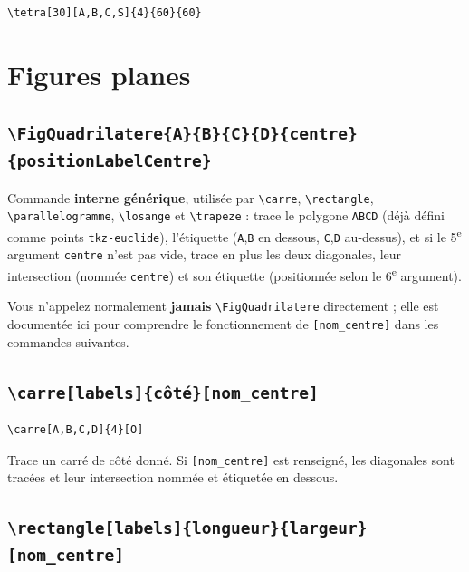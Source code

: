 \documentclass[11pt,a4paper]{article}
\newcommand{\pkg}[1]{\texttt{#1}}
\newcommand{\cmdname}[1]{\texttt{\textbackslash#1}}
\begin{document}
\begin{lstlisting}
\tetra[30][A,B,C,S]{4}{60}{60}
\end{lstlisting}

\section{Figures planes}

\subsection{\cmdname{FigQuadrilatere\{A\}\{B\}\{C\}\{D\}\{centre\}\{positionLabelCentre\}}}

Commande \textbf{interne générique}, utilisée par \cmdname{carre}, \cmdname{rectangle}, \cmdname{parallelogramme}, \cmdname{losange} et \cmdname{trapeze} : trace le polygone \texttt{ABCD} (déjà défini comme points \pkg{tkz-euclide}), l'étiquette (\texttt{A},\texttt{B} en dessous, \texttt{C},\texttt{D} au-dessus), et si le 5\textsuperscript{e} argument \texttt{centre} n'est pas vide, trace en plus les deux diagonales, leur intersection (nommée \texttt{centre}) et son étiquette (positionnée selon le 6\textsuperscript{e} argument).

\begin{noteFig}
Vous n'appelez normalement \textbf{jamais} \cmdname{FigQuadrilatere} directement ; elle est documentée ici pour comprendre le fonctionnement de \texttt{[nom\_centre]} dans les commandes suivantes.
\end{noteFig}

\subsection{\cmdname{carre[labels]\{côté\}[nom\_centre]}}

\begin{lstlisting}
\carre[A,B,C,D]{4}[O]
\end{lstlisting}

Trace un carré de côté donné. Si \texttt{[nom\_centre]} est renseigné, les diagonales sont tracées et leur intersection nommée et étiquetée en dessous.

\subsection{\cmdname{rectangle[labels]\{longueur\}\{largeur\}[nom\_centre]}}
\end{document}
